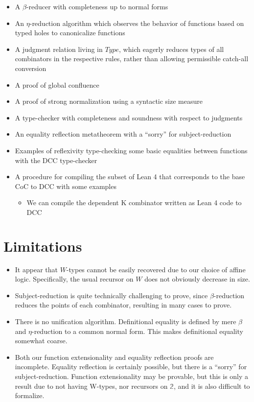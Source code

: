 \documentclass{article}
\begin{document}
\begin{itemize}
  \item A \(\beta\)-reducer with completeness up to normal forms
  \item An \(\eta\)-reduction algorithm which observes the behavior of functions based on typed holes to canonicalize functions
  \item A judgment relation living in \(Type\), which eagerly reduces types of all combinators in the respective rules, rather than allowing permissible catch-all conversion
  \item A proof of global confluence
  \item A proof of strong normalization using a syntactic size measure
  \item A type-checker with completeness and soundness with respect to judgments
  \item An equality reflection metatheorem with a ``sorry'' for subject-reduction
  \item Examples of reflexivity type-checking some basic equalities between functions with the DCC type-checker
  \item A procedure for compiling the subset of Lean 4 that corresponds to the base CoC to DCC with some examples
    \begin{itemize}
      \item We can compile the dependent K combinator written as Lean 4 code to DCC
    \end{itemize}
\end{itemize}

\section{Limitations}

\begin{itemize}
  \item It appear that \(W\)-types cannot be easily recovered due to our choice of affine logic. Specifically, the usual recursor on \(W\) does not obviously decrease in size.
  \item Subject-reduction is quite technically challenging to prove, since \(\beta\)-reduction reduces the points of each combinator, resulting in many cases to prove.
  \item There is no unification algorithm. Definitional equality is defined by mere \(\beta\) and \(\eta\)-reduction to a common normal form. This makes definitional equality somewhat coarse.
  \item Both our function extensionality and equality reflection proofs are incomplete. Equality reflection is certainly possible, but there is a ``sorry'' for subject-reduction. Function extensionality may be provable, but this is only a result due to not having W-types, nor recursors on \(\mathbb{2}\), and it is also difficult to formalize.
\end{itemize}

\printbibliography{}
\end{document}
